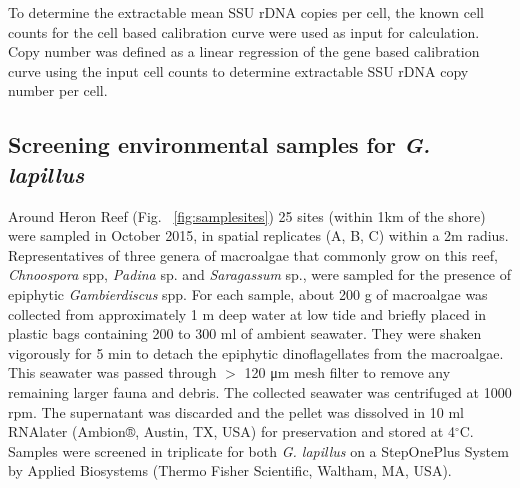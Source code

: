 \documentclass[12pt]{article}
\begin{document}
To determine the extractable mean SSU rDNA copies per cell, the known cell counts for the cell based calibration curve were used as input for calculation. 
Copy number was defined as a linear regression of the gene based calibration curve using the input cell counts to determine extractable SSU rDNA copy number per cell.

\subsection*{Screening environmental samples for \emph{G. lapillus}}%
\FloatBarrier
Around Heron Reef (Fig. ~\ref{fig:samplesites}) 25 sites (within 1km of the shore) were sampled in October 2015, in spatial replicates (A, B, C) within a 2m radius. 
Representatives of three genera of macroalgae that commonly grow on this reef, \textit{Chnoospora} spp, \textit{Padina} sp. and \textit{Saragassum} sp., were sampled for the presence of epiphytic \emph{Gambierdiscus} spp. For each sample, about 200 g of macroalgae was collected from approximately 1 m deep water at low tide and briefly placed in plastic bags containing 200 to 300 ml of ambient seawater. 
They were shaken vigorously for 5 min to detach the epiphytic dinoflagellates from the macroalgae. 
This seawater was passed through $>$ 120 μm mesh filter to remove any remaining larger fauna and debris. 
The collected seawater was centrifuged at 1000 rpm. The supernatant was discarded and the pellet was dissolved in 10 ml RNAlater (Ambion®, Austin, TX, USA) for preservation and stored at 4$^{\circ}$C.
Samples were screened in triplicate for both \emph{G. lapillus} %
on a StepOnePlus System by Applied Biosystems (Thermo Fisher Scientific, Waltham, MA, USA).
\end{document}
